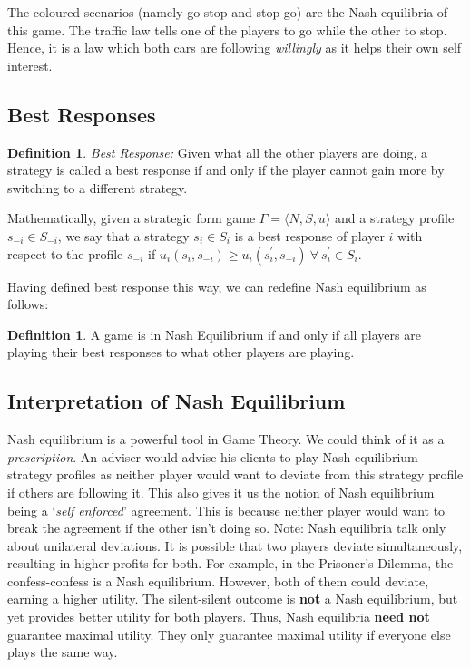 \documentclass{article}
\theoremstyle{definition}
\newtheorem{defn}[theorem]{Definition}
\begin{document}
The coloured scenarios (namely go-stop and stop-go) are the Nash equilibria of this game. The traffic law tells one of the players to go while the other to stop. Hence, it is a law which both cars are following \textit{willingly} as it helps their own self interest. 

\subsection{Best Responses}

\begin{defn}
\textit{Best Response:} Given what all the other players are doing, a strategy is called a best response if and only if the player cannot gain more by switching to a different strategy. \medskip

Mathematically, given a strategic form game $\Gamma = \langle N, S, u \rangle$ and a strategy profile $s_{-i} \in S_{-i}$, we say that a strategy $s_i \in S_i$ is a best response of player $i$ with respect to the profile $s_{-i}$ if $u_i(s_i, s_{-i}) \geq u_i(s^{\prime}_{i}, s_{-i}) \: \forall \: s^{\prime}_{i} \in S_i$.
\end{defn}

Having defined best response this way, we can redefine Nash equilibrium as follows:

\begin{defn}
A game is in Nash Equilibrium if and only if all players are playing their best responses to what other players are playing.
\end{defn}

\subsection{Interpretation of Nash Equilibrium}

Nash equilibrium is a powerful tool in Game Theory. We could think of it as a \textit{prescription}. An adviser would advise his clients to play Nash equilibrium strategy profiles as neither player would want to deviate from this strategy profile if others are following it. This also gives it us the notion of Nash equilibrium being a `\textit{self enforced}' agreement. This is because neither player would want to break the agreement if the other isn't doing so. Note: Nash equilibria talk only about unilateral deviations. It is possible that two players deviate simultaneously, resulting in higher profits for both. For example, in the Prisoner's Dilemma, the confess-confess is a Nash equilibrium. However, both of them could deviate, earning a higher utility. The silent-silent outcome is \textbf{not} a Nash equilibrium, but yet provides better utility for both players. Thus, Nash equilibria \textbf{need not} guarantee maximal utility. They only guarantee maximal utility if everyone else plays the same way. \medskip
\end{document}

